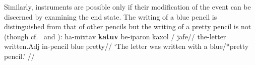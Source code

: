 Similarly, instruments are possible only if their modification of the event can be discerned by examining the end state. The writing of a blue pencil is distinguished from that of other pencils but the writing of a pretty pencil is not (though cf.~\citealt{mcintyre13} and \citealt{bruening14nllt}):
\ex
	\begingl
		\gla ha-mixtav \textbf{katuv} be-iparon {\cmark}kaxol / {\xmark}jafe//
		\glb the-letter written.Adj in-pencil \phantom{\cmark}blue {} \phantom{\xmark}pretty//
		\glft `The letter was written with a blue/*pretty pencil.' //
	\endgl
\xe

%


